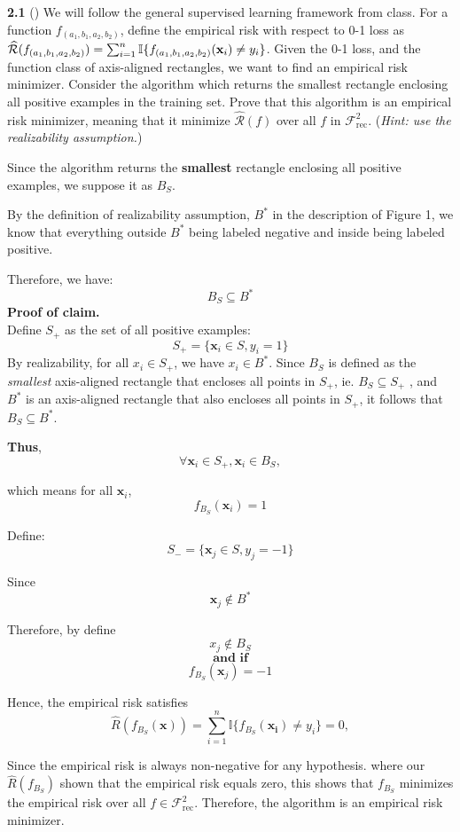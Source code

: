 \textbf{2.1} () We will follow the general supervised learning framework from class. For a function $f_{(a_1,b_1,a_2,b_2)}$, define the empirical risk with respect to 0-1 loss as $\widehat{\mathcal{R}}(f_{(a_1,b_1,a_2,b_2)})=\sum_{i=1}^n\mathbb{I}\{f_{(a_1,b_1,a_2,b_2)}(\mathbf{x}_i)\neq y_i\}$. Given the 0-1 loss, and the function class of axis-aligned rectangles, we want to find an empirical risk minimizer. Consider the algorithm which returns the smallest rectangle enclosing all positive examples in the training set. Prove that this algorithm is an empirical risk minimizer, meaning that it minimize $\widehat{\mathcal{R}}(f)$ over all $f$ in $\mathcal{F}_{\text{rec}}^2$. (\emph{Hint: use the realizability assumption.})\\


Since the algorithm returns the \textbf{smallest} rectangle enclosing all positive examples, we suppose it as $B_S$.

By the definition of realizability assumption, $B^*$ in the description of Figure 1, we know that everything outside $B^*$ being labeled negative and inside being labeled positive.

Therefore, we have:
\[
B_S \subseteq B^*
\]
\textbf{Proof of claim.} \\
Define $S_+$ as the set of all positive examples:
\[
S_+ = \{\mathbf{x}_i \in S, y_i = 1\}
\]
By realizability, for all $x_i \in S_+$, we have $x_i \in B^*$. 
Since $B_S$ is defined as the \emph{smallest} axis-aligned rectangle that encloses
all points in $S_+$, ie. $B_S \subseteq S_+$ \;, and $B^*$ is an axis-aligned rectangle that also encloses all
points in $S_+$, it follows that $B_S \subseteq B^*$.

\medskip
\textbf{Thus},
\[
\forall \mathbf{x}_i \in S_+ , \mathbf{x}_i \in B_S ,
\]

which means for all $\mathbf{x}_i$, 
\[
f_{B_S}(\mathbf{x}_i) = 1
\]

Define:
\[
S_- = \{\mathbf{x}_j \in S, y_j = -1\}
\]

Since
\[
\mathbf{x}_j \notin B^*
\]

Therefore, by define
\[
x_j \notin B_S
\]
\[
\textbf{and if}
\]
\[
f_{B_S}(\mathbf{x}_j) = -1
\]

Hence, the empirical risk satisfies
\[
\hat{R}(f_{B_S}(\mathbf{x})) = \sum_{i=1}^n \mathbb{I}\{f_{B_S}(\mathbf{x_i}) \neq y_i\} = 0,
\]

Since the empirical risk is always non-negative for any hypothesis. where our $\hat{R}(f_{B_S})$ shown that the empirical risk equals zero, this shows that $f_{B_S}$ minimizes the empirical risk over all $f \in \mathcal{F}_{\text{rec}}^2$.
Therefore, the algorithm is an empirical risk minimizer.
\bigskip


